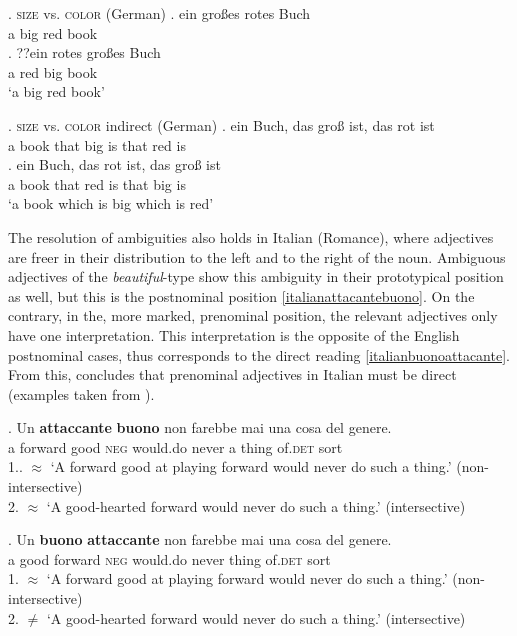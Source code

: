 \documentclass [output=book,colorlinks,citecolor=brown]{langscibook}
\begin{document}
\ex. \label{bigredgerman} \textsc{size} vs. \textsc{color} (German)
\ag. ein großes rotes Buch\\
a big red book\\
\bg. ??ein rotes großes Buch\\
a red big book\\
`a big red book’

\ex. \label{bigredrcgerman} \textsc{size} vs. \textsc{color} indirect (German)
\ag. ein Buch, das groß ist, das rot ist\\
a book that big is that red is\\
\bg. ein Buch, das rot ist, das groß ist\\
a book that red is that big is\\
`a book which is big which is red’

The resolution of ambiguities also holds in Italian (Romance), where adjectives are freer in their distribution to the left and to the right of the noun. Ambiguous adjectives of the \textit{beautiful}-type show this ambiguity in their prototypical position as well, but this is the postnominal position \ref{italianattacantebuono}. On the contrary, in the, more marked, prenominal position, the relevant adjectives only have one interpretation. This interpretation is the opposite of the English postnominal cases, thus corresponds to the direct reading \ref{italianbuonoattacante}. From this, \citet[ch. 2.4]{cinque:2010:adj} concludes that prenominal adjectives in Italian must be direct (examples taken from \citealt[10]{cinque:2010:adj}). %

\exg. Un \textbf{attaccante} \textbf{buono} non farebbe mai una cosa del genere.\\
a forward good \textsc{neg} would.do never a thing of.\textsc{det} sort\\
1.. $\approx$ `A forward good at playing forward would never do such a thing.’ (non-intersective)\\
2. $\approx$ `A good-hearted forward would never do such a thing.’ (intersective) \label{italianattacantebuono}

\exg. Un \textbf{buono} \textbf{attaccante} non farebbe mai una cosa del genere.\\
a good forward \textsc{neg} would.do never thing of.\textsc{det} sort\\
1. $\approx$ `A forward good at playing forward would never do such a thing.’ (non-intersective)\\
2. $\neq$ `A good-hearted forward would never do such a thing.’ (intersective) \label{italianbuonoattacante}
\end{document}
